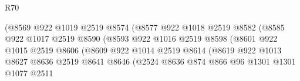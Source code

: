 \begin{lexlean}{R70}
\begin{coremodule}
                                        (@8569
                                          @922
                                          @1019
                                          @2519
                                          @8574
                                          (@8577
                                            @922
                                            @1018
                                            @2519
                                            @8582
                                            (@8585
                                              @922
                                              @1017
                                              @2519
                                              @8590
                                              (@8593
                                                @922
                                                @1016
                                                @2519
                                                @8598
                                                (@8601
                                                  @922
                                                  @1015
                                                  @2519
                                                  @8606
                                                  (@8609
                                                    @922
                                                    @1014
                                                    @2519
                                                    @8614
                                                    (@8619
                                                      @922
                                                      @1013
                                                      @8627
                                                      @8636
                                                      @2519
                                                      @8641
                                                      @8646
                                                      (@2524
                                                        @8636
                                                        @874
                                                        @866
                                                        @96
                                                        @1301
                                                        @1301
                                                        @1077
                                                        @2511

\end{coremodule}
\end{lexlean}
